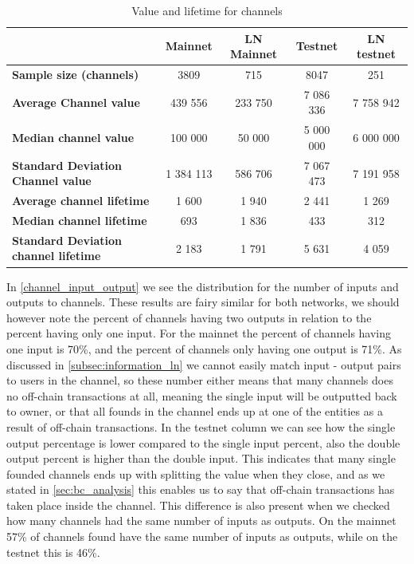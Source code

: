 \begin{table}[ht]
\centering
\caption{Value and lifetime for channels}
\label{subgraph_stats}
\begin{tabular}{l|c|c|c|c}
                                              & \textbf{Mainnet} & \textbf{LN Mainnet}& \textbf{Testnet} & \textbf{LN testnet} \\ \hline
\textbf{Sample size (channels)}              & 3809             & 715           & 8047                     & 251            \\ \hline
\textbf{Average Channel value}               & 439 556          & 233 750         & 7 086 336            &7 758 942       \\ \hline
\textbf{Median channel value}                & 100 000          & 50 000         & 5 000 000            & 6 000 000        \\ \hline
\textbf{Standard Deviation Channel value}    & 1 384 113        & 586 706       & 7 067 473            & 7 191 958        \\ \hline
\textbf{Average channel lifetime}            & 1 600            & 1 940           & 2 441                & 1 269            \\ \hline
\textbf{Median channel lifetime}             & 693              & 1 836             & 433                  & 312              \\ \hline
\textbf{Standard Deviation channel lifetime} & 2 183            & 1 791           & 5 631                & 4 059            \\ \hline
\end{tabular}
\end{table}

In \cref{channel_input_output} we see the distribution for the number of inputs and outputs to channels. These results are fairy similar for both networks, we should however note the percent of channels having two outputs in relation to the percent having only one input. For the mainnet the percent of channels having one input is 70\%, and the percent of channels only having one output is 71\%. As discussed in \cref{subsec:information_ln} we cannot easily match input - output pairs to users in the channel, so these number either means that many channels does no off-chain transactions at all, meaning the single input will be outputted back to owner, or that all founds in the channel ends up at one of the entities as a result of off-chain transactions. In the testnet column we can see how the single output percentage is lower compared to the single input percent, also the double output percent is higher than the double input. This indicates that many single founded channels ends up with splitting the value when they close, and as we stated in \cref{sec:bc_analysis} this enables us to say that off-chain transactions has taken place inside the channel.
This difference is also present when we checked how many channels had the same number of inputs as outputs. On the mainnet 57\% of channels found have the same number of inputs as outputs, while on the testnet this is 46\%. 
\\

